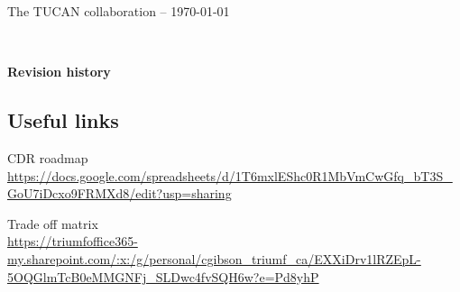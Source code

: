 \documentclass[11pt]{article}
\begin{document}
\begin{titlepage}
	
    The TUCAN collaboration -- \today
    
	\vspace*{3\baselineskip} %
	
	
		
        
 	{\scshape \@author \\} 
     \vspace*{3\baselineskip}
     
	

\end{titlepage}





\clearpage
\vspace*{19cm}
\noindent
{\large \textbf{Revision history}} \\
\vspace{0.1cm}








\clearpage
\tableofcontents
 \clearpage
 \subsection{Useful links}
 CDR roadmap\\
  \url{https://docs.google.com/spreadsheets/d/1T6mxlEShc0R1MbVmCwGfq_bT3S_GoU7iDcxo9FRMXd8/edit?usp=sharing}
  
  Trade off matrix\\
  \url{https://triumfoffice365-my.sharepoint.com/:x:/g/personal/cgibson_triumf_ca/EXXiDrv1lRZEpL-5OQGlmTcB0eMMGNFj_SLDwc4fvSQH6w?e=Pd8yhP}
  
\end{document}
